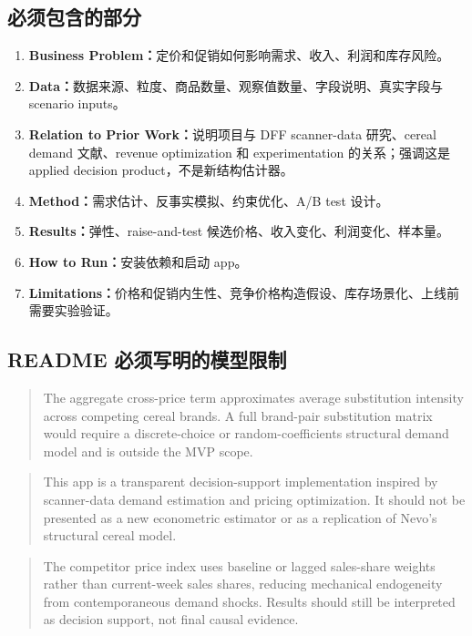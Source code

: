 \documentclass[UTF8,11pt,a4paper,fontset=none]{ctexart}
\begin{document}
\subsection{必须包含的部分}

\begin{enumerate}
  \item \textbf{Business Problem：}定价和促销如何影响需求、收入、利润和库存风险。
  \item \textbf{Data：}数据来源、粒度、商品数量、观察值数量、字段说明、真实字段与 scenario inputs。
  \item \textbf{Relation to Prior Work：}说明项目与 DFF scanner-data 研究、cereal demand 文献、revenue optimization 和 experimentation 的关系；强调这是 applied decision product，不是新结构估计器。
  \item \textbf{Method：}需求估计、反事实模拟、约束优化、A/B test 设计。
  \item \textbf{Results：}弹性、raise-and-test 候选价格、收入变化、利润变化、样本量。
  \item \textbf{How to Run：}安装依赖和启动 app。
  \item \textbf{Limitations：}价格和促销内生性、竞争价格构造假设、库存场景化、上线前需要实验验证。
\end{enumerate}

\subsection{README 必须写明的模型限制}

\begin{quote}
The aggregate cross-price term approximates average substitution intensity across competing cereal brands. A full brand-pair substitution matrix would require a discrete-choice or random-coefficients structural demand model and is outside the MVP scope.
\end{quote}

\begin{quote}
This app is a transparent decision-support implementation inspired by scanner-data demand estimation and pricing optimization. It should not be presented as a new econometric estimator or as a replication of Nevo's structural cereal model.
\end{quote}

\begin{quote}
The competitor price index uses baseline or lagged sales-share weights rather than current-week sales shares, reducing mechanical endogeneity from contemporaneous demand shocks. Results should still be interpreted as decision support, not final causal evidence.
\end{quote}
\end{document}
